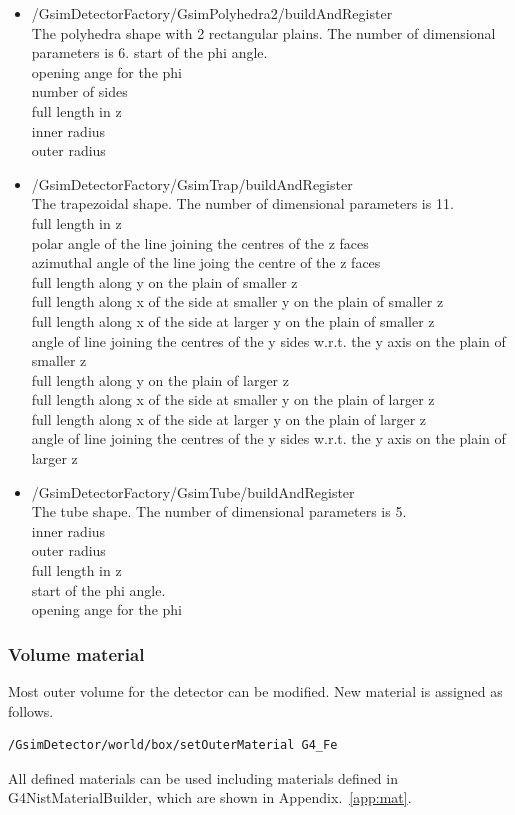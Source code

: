 \documentclass[a4paper,12pt]{article}
\begin{document}
\begin{itemize}
	inner radius for larger z\\
	outer radius for larger z
  \item /GsimDetectorFactory/GsimPolyhedra2/buildAndRegister\\
	The polyhedra shape with 2 rectangular plains.
	The number of dimensional parameters is 6.
	start of the phi angle.\\
	opening ange for the phi\\
	number of sides\\
	full length in z\\
	inner radius\\
	outer radius
  \item /GsimDetectorFactory/GsimTrap/buildAndRegister\\
	The trapezoidal shape.
	The number of dimensional parameters is 11.\\
	full length in z\\
	polar angle of the line joining the centres of the z faces\\
	azimuthal angle of the line joing the centre of the z faces\\
	full length along y on the plain of smaller z\\
	full length along x of the side at smaller y on the plain of smaller z\\
	full length along x of the side at larger y on the plain of smaller z\\
	angle of line joining the centres of the y sides w.r.t. the y
	axis on the plain of smaller z\\
	full length along y on the plain of larger z\\
	full length along x of the side at smaller y on the plain of larger z\\
	full length along x of the side at larger y on the plain of larger z\\
	angle of line joining the centres of the y sides w.r.t. the y
	axis on the plain of larger z
  \item /GsimDetectorFactory/GsimTube/buildAndRegister\\
	The tube shape.
	The number of dimensional parameters is 5.\\
	inner radius\\
	outer radius\\
	full length in z\\
	start of the phi angle.\\
	opening ange for the phi
 \end{itemize}
 \subsubsection{Volume material}
 Most outer volume for the detector can be modified. New material is
 assigned as follows.
 \begin{screen}
  \begin{verbatim}
/GsimDetector/world/box/setOuterMaterial G4_Fe\end{verbatim}
 \end{screen}
  All defined materials can be used including materials defined in
  G4NistMaterialBuilder, which are shown in Appendix.~\ref{app:mat}. 
 
\end{document}
